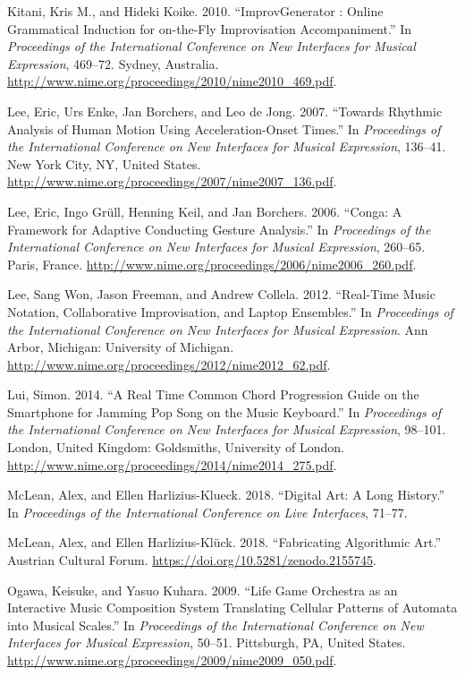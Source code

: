 \documentclass{nime-alternate} %
\newlength{\cslhangindent}
\newenvironment{cslreferences}%
  {\setlength{\parindent}{0pt}%
  \everypar{\setlength{\hangindent}{\cslhangindent}}\ignorespaces}%
  {\par}
\begin{document}
\begin{cslreferences}
\leavevmode\hypertarget{ref-Kitani2010}{}%
Kitani, Kris M., and Hideki Koike. 2010. ``ImprovGenerator : Online
Grammatical Induction for on-the-Fly Improvisation Accompaniment.'' In
\emph{Proceedings of the International Conference on New Interfaces for
Musical Expression}, 469--72. Sydney, Australia.
\url{http://www.nime.org/proceedings/2010/nime2010_469.pdf}.

\leavevmode\hypertarget{ref-Lee2007}{}%
Lee, Eric, Urs Enke, Jan Borchers, and Leo de Jong. 2007. ``Towards
Rhythmic Analysis of Human Motion Using Acceleration-Onset Times.'' In
\emph{Proceedings of the International Conference on New Interfaces for
Musical Expression}, 136--41. New York City, NY, United States.
\url{http://www.nime.org/proceedings/2007/nime2007_136.pdf}.

\leavevmode\hypertarget{ref-Lee2006}{}%
Lee, Eric, Ingo Grüll, Henning Keil, and Jan Borchers. 2006. ``Conga: A
Framework for Adaptive Conducting Gesture Analysis.'' In
\emph{Proceedings of the International Conference on New Interfaces for
Musical Expression}, 260--65. Paris, France.
\url{http://www.nime.org/proceedings/2006/nime2006_260.pdf}.

\leavevmode\hypertarget{ref-Lee:2012a}{}%
Lee, Sang Won, Jason Freeman, and Andrew Collela. 2012. ``Real-Time
Music Notation, Collaborative Improvisation, and Laptop Ensembles.'' In
\emph{Proceedings of the International Conference on New Interfaces for
Musical Expression}. Ann Arbor, Michigan: University of Michigan.
\url{http://www.nime.org/proceedings/2012/nime2012_62.pdf}.

\leavevmode\hypertarget{ref-slui2014}{}%
Lui, Simon. 2014. ``A Real Time Common Chord Progression Guide on the
Smartphone for Jamming Pop Song on the Music Keyboard.'' In
\emph{Proceedings of the International Conference on New Interfaces for
Musical Expression}, 98--101. London, United Kingdom: Goldsmiths,
University of London.
\url{http://www.nime.org/proceedings/2014/nime2014_275.pdf}.

\leavevmode\hypertarget{ref-McLean18}{}%
McLean, Alex, and Ellen Harlizius-Klueck. 2018. ``Digital Art: A Long
History.'' In \emph{Proceedings of the International Conference on Live
Interfaces}, 71--77.

\leavevmode\hypertarget{ref-McLean18b}{}%
McLean, Alex, and Ellen Harlizius-Klück. 2018. ``Fabricating Algorithmic
Art.'' Austrian Cultural Forum.
\url{https://doi.org/10.5281/zenodo.2155745}.

\leavevmode\hypertarget{ref-Ogawa2009}{}%
Ogawa, Keisuke, and Yasuo Kuhara. 2009. ``Life Game Orchestra as an
Interactive Music Composition System Translating Cellular Patterns of
Automata into Musical Scales.'' In \emph{Proceedings of the
International Conference on New Interfaces for Musical Expression},
50--51. Pittsburgh, PA, United States.
\url{http://www.nime.org/proceedings/2009/nime2009_050.pdf}.


\end{cslreferences}
\end{document}
